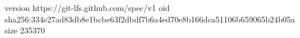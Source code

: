 version https://git-lfs.github.com/spec/v1
oid sha256:334e27ad83db8e1bcbe63f2dbdf7b6a4ed70e8b166dca51106b659065b24b05a
size 235370
